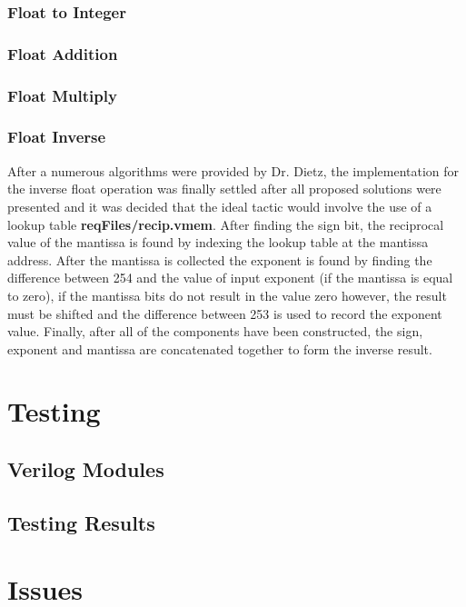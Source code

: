 \documentclass[conference]{IEEEtran}
\begin{document}
\subsubsection{Float to Integer}

\subsubsection{Float Addition}

\subsubsection{Float Multiply}

\subsubsection{Float Inverse}
After a numerous algorithms were provided by Dr. Dietz, the implementation for the 
inverse float operation was finally settled after all proposed solutions were presented
and it was decided that the ideal tactic would involve the use of a lookup 
table \textbf{reqFiles/recip.vmem}. After finding the sign bit, the reciprocal value of the mantissa
is found by indexing the lookup table at the mantissa address. After the mantissa is collected
the exponent is found by finding the difference between 254 and the value of input exponent (if 
the mantissa is equal to zero), if the mantissa bits do not result in the value zero however, the 
result must be shifted and the difference between 253 is used to record the exponent value.
Finally, after all of the components have been constructed, the sign, exponent and mantissa
are concatenated together to form the inverse result. 
 


\section{Testing}

\subsection{Verilog Modules}

\subsection{Testing Results}

\section{Issues}
\end{document}
